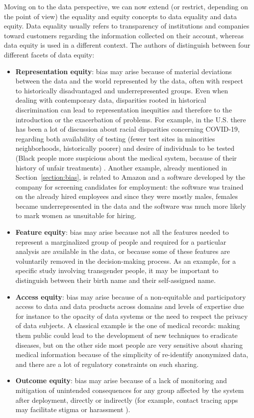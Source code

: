 Moving on to the data perspective, we can now extend (or restrict, depending on the point of view) the equality and equity concepts to data equality and data equity. Data equality usually refers to transparency of institutions and companies toward customers regarding the information collected on their account, whereas data equity is used in a different context. The authors of \cite{jagadish2021facets} distinguish between four different facets of data equity:
\begin{itemize}
\item \textbf{Representation equity}: bias may arise because of material deviations between the data and the world represented by the data, often with respect to historically disadvantaged and underrepresented groups. Even when dealing with contemporary data, disparities rooted in historical discrimination can lead to representation inequities and therefore to the introduction or the exacerbation of problems. For example, in the U.S. there has been a lot of discussion about racial disparities concerning COVID-19, regarding both availability of testing (fewer test sites in minorities neighborhoods, historically poorer) and desire of individuals to be tested (Black people more suspicious about the medical system, because of their history of unfair treatments) \cite{jagadish2021facets}. Another example, already mentioned in Section~\ref{section:bias}, is related to Amazon and a software developed by the company for screening candidates for employment: the software was trained on the already hired employees and since they were mostly males, females became underrepresented in the data and the software was much more likely to mark women as unsuitable for hiring.
\item \textbf{Feature equity}: bias may arise because not all the features needed to represent a marginalized group of people and required for a particular analysis are available in the data, or because some of these features are voluntarily removed in the decision-making process. As an example, for a specific study involving transgender people, it may be important to distinguish between their birth name and their self-assigned name.
\item \textbf{Access equity}: bias may arise because of a non-equitable and participatory access to data and data products across domains and levels of expertise due for instance to the opacity of data systems or the need to respect the privacy of data subjects. A classical example is the one of medical records: making them public could lead to the development of new techniques to eradicate diseases, but on the other side most people are very sensitive about sharing medical information because of the simplicity of re-identify anonymized data, and there are a lot of regulatory constraints on such sharing.
\item \textbf{Outcome equity}: bias may arise because of a lack of monitoring and mitigation of unintended consequences for any group affected by the system after deployment, directly or indirectly (for example, contact tracing apps may facilitate stigma or harassment \cite{jagadish2021covid}).
\end{itemize}


